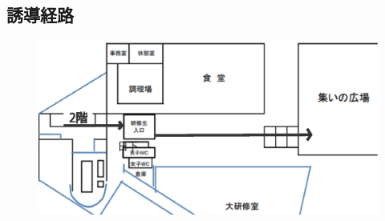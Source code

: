 \newpage

\subsection{誘導経路}
\begin{figure}[h]
\begin{center}
  \includegraphics[scale=0.6]{./17/asanozu.eps}
\end{center}
\end{figure}





%
